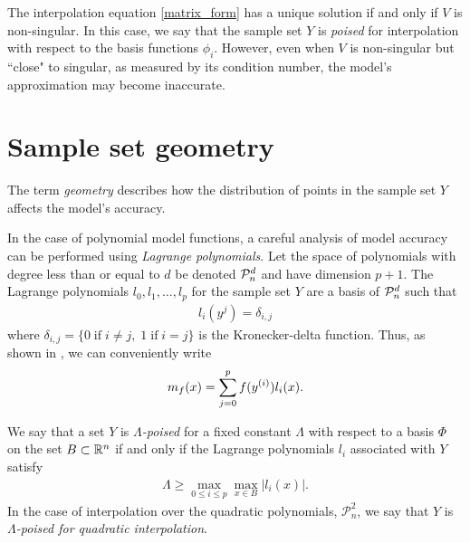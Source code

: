 The interpolation equation \cref{matrix_form} has a unique solution if and only if $V$ is non-singular.  In this case, we say that the sample set $Y$ is \emph{poised} for interpolation with respect to the basis functions $\phi_i$. 
However, even when $V$ is non-singular but ``close" to singular, as measured by its condition number, the model's approximation may become inaccurate.


\section{Sample set geometry}
\label{geometry}
The term \emph{geometry} describes how the distribution of points in the sample set $Y$ affects the model's accuracy.

In the case of polynomial model functions, a careful analysis of model accuracy can be performed using \emph{Lagrange polynomials}.
Let the space of polynomials with degree less than or equal to $d$ be denoted $\mathcal{P}^d_n$ and have dimension $p+1$.
The Lagrange polynomials $l_0, l_1, \ldots, l_p$ for the sample set $Y$ are a basis of $\mathcal{P}^d_n$ such that
\begin{align}
l_i(y^j) = \delta_{i,j}
\end{align}
where $\delta_{i,j} = \{0 \;\text{if}\; i\ne j,\; 1 \;\text{if} \; i = j \}$ is the Kronecker-delta function.
Thus, as shown in \cite{introduction_book}, we can conveniently write
\begin{align}
\label{reg}
{{m}_f}(x) = \sum^p_{j=0}f(y^{(i)})l_i(x).
\end{align}


We say that a set $Y$ is \emph{$\Lambda$-poised} for a fixed constant $\Lambda$ with respect to a basis $\Phi$ on the set 
$B \subset\mathbb R^n$ if and only if the Lagrange polynomials $l_i$ associated with $Y$ satisfy
\begin{align}
\Lambda \ge \max_{0\le i\le p}\max_{x\in B}|l_i(x)|.
\end{align}
In the case of interpolation over the quadratic polynomials, 
$ \mathcal{P}^2_n$, we say that $Y$ is \emph{$\Lambda$-poised for quadratic interpolation}.

